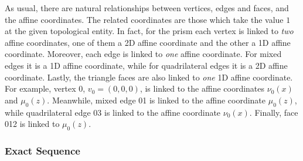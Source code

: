 As usual, there are natural relationships between vertices, edges and faces, and the affine coordinates.
The related coordinates are those which take the value $1$ at the given topological entity.
In fact, for the prism each vertex is linked to \textit{two} affine coordinates, one of them a 2D affine coordinate and the other a 1D affine coordinate.
Moreover, each edge is linked to \textit{one} affine coordinate.
For mixed edges it is a 1D affine coordinate, while for quadrilateral edges it is a 2D affine coordinate.
Lastly, the triangle faces are also linked to \textit{one} 1D affine coordinate.
For example, vertex $0$, $v_0=(0,0,0)$, is linked to the affine coordinates $\nu_0(x)$ and $\mu_0(z)$.
Meanwhile, mixed edge 01 is linked to the affine coordinate $\mu_0(z)$, while quadrilateral edge 03 is linked to the affine coordinate $\nu_0(x)$.
Finally, face 012 is linked to $\mu_0(z)$.

\subsubsection*{Exact Sequence}

